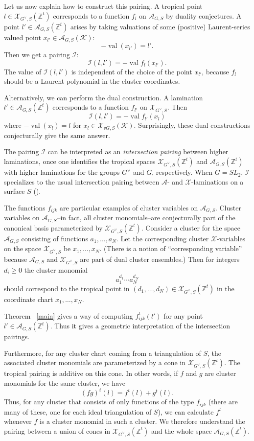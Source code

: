 \documentclass[ALCO,ThmDefs,Unicode,epreuves]{cedram}
\newcommand{\Zt}{\mathbb{Z}^t}
\newcommand{\A}{\mathcal{A}}
\newcommand{\X}{\mathcal{X}}
\newcommand{\vG}{G^\vee}
\newcommand{\cK}{\mathcal{K}}
\newcommand{\val}{\operatorname{val}}
\begin{document}
Let us now explain how to construct this pairing. A tropical point $l \in \X_{\vG,S}(\Zt)$ corresponds to a function $f_l$ on $\A_{G,S}$ by duality conjectures. A point $l' \in \A_{G,S}(\Zt)$ arises by taking valuations of some (positive) Laurent-series valued point $x_{l'} \in \A_{G,S}(\cK)$:
\[
-\val(x_{l'}) = l'.
\]
Then we get a pairing $\mathcal{I}$:
\[
\mathcal{I}(l,l')=-\val f_l(x_{l'}).
\]
The value of $\mathcal{I}(l,l')$ is independent of the choice of the point $x_{l'}$, because $f_l$ should be a Laurent polynomial in the cluster coordinates.

Alternatively, we can perform the dual construction. A lamination $l' \in \A_{G,S}(\Zt)$ corresponds to a function $f_{l'}$ on $\X_{\vG,S}$. Then 
\[
\mathcal{I}(l,l')=-\val f_{l'}(x_{l})
\]
where $-\val(x_{l}) = l$ for $x_{l} \in \X_{vG,S}(\cK)$. Surprisingly, these dual constructions conjecturally give the same answer.

The pairing $\mathcal{I}$ can be interpreted as an \emph{intersection pairing} between higher laminations, once one identifies the tropical spaces $\X_{\vG,S}(\Zt)$ and $\A_{G,S}(\Zt)$ with higher laminations for the groups $\vG$ and $G$, respectively. When $G=SL_2$, $\mathcal{I}$ specializes to the usual intersection pairing between $\A$- and $\X$-laminations on a surface $S$ (\cite{FG1}).

The functions $f_{ijk}$ are particular examples of cluster variables on $\A_{G,S}$. Cluster variables on $\A_{G,S}$--in fact, all cluster monomials--are conjecturally part of the canonical basis parameterized by $\X_{\vG,S}(\Zt)$. Consider a cluster for the space $\A_{G,S}$ consisting of functions $a_1, \dots, a_N$. Let the corresponding cluster $\X$-variables on the space $\X_{\vG,S}$ be $x_1, \dots, x_N$. (There is a notion of ``corresponding variable'' because $\A_{G,S}$ and $\X_{\vG,S}$ are part of dual cluster ensembles.) Then for integers $d_i \geq 0$ the cluster monomial 
\[
a_1^{d_1} \cdots a_N^{d_N}
\]
should correspond to the tropical point in $(d_1, \dots, d_N) \in \X_{\vG,S}(\Zt)$ in the coordinate chart $x_1, \dots, x_N$.

Theorem ~\ref{main} gives a way of computing $f^t_{ijk}(l')$ for any point $l' \in \A_{G,S}(\Zt)$. Thus it gives a geometric interpretation of the intersection pairings. 

Furthermore, for any cluster chart coming from a triangulation of $S$, the associated cluster monomials are parameterized by a cone in $\X_{\vG,S}(\Zt)$. The tropical pairing is additive on this cone. In other words, if $f$ and $g$ are cluster monomials for the same cluster, we have
\[
(fg)^t(l) = f^t(l)+g^t(l).
\]
Thus, for any cluster that consists of only functions of the type $f_{ijk}$ (there are many of these, one for each ideal triangulation of $S$), we can calculate $f^t$ whenever $f$ is a cluster monomial in such a cluster. We therefore understand the pairing between a union of cones in $\X_{\vG,S}(\Zt)$ and the whole space $\A_{G,S}(\Zt)$.
\end{document}
